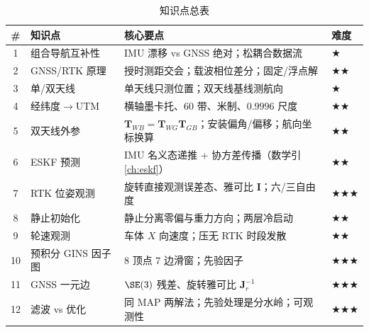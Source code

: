 \begin{table}[H]\centering\small
\caption{知识点总表}
\label{tab:gins-summary}
\begin{tabular}{clll}
\toprule
\# & 知识点 & 核心要点 & 难度 \\
\midrule
1 & 组合导航互补性 & IMU 漂移 vs GNSS 绝对；松耦合数据流 & $\bigstar$ \\
2 & GNSS/RTK 原理 & 授时测距交会；载波相位差分；固定/浮点解 & $\bigstar\bigstar$ \\
3 & 单/双天线 & 单天线只测位置；双天线基线测航向 & $\bigstar$ \\
4 & 经纬度$\to$UTM & 横轴墨卡托、$60$ 带、米制、$0.9996$ 尺度 & $\bigstar\bigstar$ \\
5 & 双天线外参 & $\mathbf{T}_{WB}=\mathbf{T}_{WG}\mathbf{T}_{GB}$；安装偏角/偏移；航向坐标换算 & $\bigstar\bigstar$ \\
6 & ESKF 预测 & IMU 名义态递推 + 协方差传播（数学引 \cref{ch:eskf}） & $\bigstar\bigstar$ \\
7 & RTK 位姿观测 & 旋转直接观测误差态、雅可比 $\mathbf{I}$；六/三自由度 & $\bigstar\bigstar\bigstar$ \\
8 & 静止初始化 & 静止分离零偏与重力方向；两层冷启动 & $\bigstar\bigstar$ \\
9 & 轮速观测 & 车体 $X$ 向速度；压无 RTK 时段发散 & $\bigstar\bigstar$ \\
10 & 预积分 GINS 因子图 & $8$ 顶点 $7$ 边滑窗；先验因子 & $\bigstar\bigstar\bigstar$ \\
11 & GNSS 一元边 & $\SE(3)$ 残差、旋转雅可比 $\mathbf{J}_r^{-1}$ & $\bigstar\bigstar\bigstar$ \\
12 & 滤波 vs 优化 & 同 MAP 两解法；先验处理是分水岭；可观测性 & $\bigstar\bigstar\bigstar$ \\
\bottomrule
\end{tabular}
\end{table}

